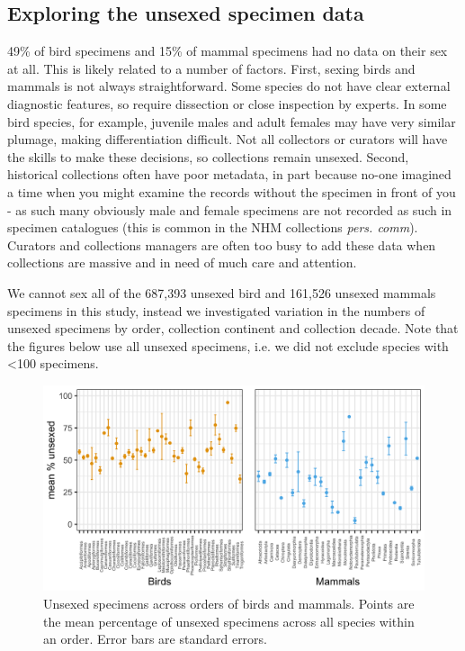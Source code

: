 \documentclass[a4paper, 12pt]{article}
\begin{document}
\subsection*{Exploring the unsexed specimen data}

49\% of bird specimens and 15\% of mammal specimens had no data on their sex at all. This is likely related to a number of factors. 
First, sexing birds and mammals is not always straightforward. Some species do not have clear external diagnostic features, so require dissection or close inspection by experts. 
In some bird species, for example, juvenile males and adult females may have very similar plumage, making differentiation difficult. 
Not all collectors or curators will have the skills to make these decisions, so collections remain unsexed. 
Second, historical collections often have poor metadata, in part because no-one imagined a time when you might examine the records without the specimen in front of you - as such many obviously male and female specimens are not recorded as such in specimen catalogues (this is common in the NHM collections \textit{pers. comm}).
 Curators and collections managers are often too busy to add these data when collections are massive and in need of much care and attention. 

We cannot sex all of the 687,393 unsexed bird and 161,526 unsexed mammals specimens in this study, instead we investigated variation in the numbers of unsexed specimens by order, collection continent and collection decade. 
Note that the figures below use all unsexed specimens, i.e. we did not exclude species with \textless 100 specimens.

\begin{figure}[H]
 \centering
  \includegraphics[width = \linewidth]{figures/nosex-orders.png}
  \caption{Unsexed specimens across orders of birds and mammals. 
  Points are the mean percentage of unsexed specimens across all species within an order. 
  Error bars are standard errors.}
  \label{fig-nosex-orders}
\end{figure}
\end{document}

